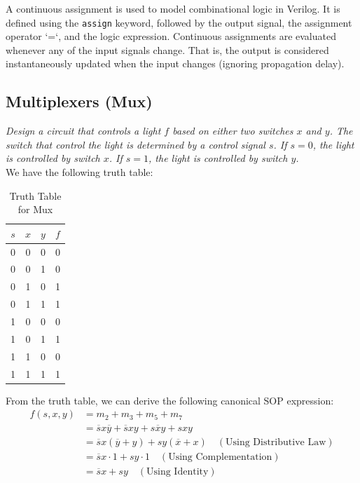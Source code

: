 \documentclass[11pt]{report}
\begin{document}
\begin{definition}
    A continuous assignment is used to model combinational logic in Verilog. It is defined using the \verb|assign| keyword, followed by the output signal, the assignment operator `=`, and the logic expression. Continuous assignments are evaluated whenever any of the input signals change. That is, the output is considered instantaneously updated when the input changes (ignoring propagation delay).
\end{definition}
\subsection{Multiplexers (Mux)}
\begin{example}
    \textit{Design a circuit that controls a light $f$ based on either two switches $x$ and $y$. The switch that control the light is determined by a control signal $s$. If $s = 0$, the light is controlled by switch $x$. If $s = 1$, the light is controlled by switch $y$.}
    \\
    We have the following truth table:

    \begin{table}[h!]
        \centering
        \begin{tabular}{|c|c|c|c|}
            \hline
            $s$ & $x$ & $y$ & $f$ \\
            \hline
            0 & 0 & 0 & 0 \\
            0 & 0 & 1 & 0 \\
            0 & 1 & 0 & 1 \\
            0 & 1 & 1 & 1 \\
            1 & 0 & 0 & 0 \\
            1 & 0 & 1 & 1 \\
            1 & 1 & 0 & 0 \\
            1 & 1 & 1 & 1 \\
            \hline
        \end{tabular}
        \caption{Truth Table for Mux}
        \label{tab:mux_truth_table}
    \end{table}
    
    From the truth table, we can derive the following canonical SOP expression:
    \begin{align*}
        f(s, x, y) &= m_2 + m_3 + m_5 + m_7 \\
        &= \overline{s}x\overline{y} + \overline{s}xy + s\overline{x}y + sxy \\
        &= \overline{s}x(\overline{y} + y) + sy(\overline{x} + x) \quad (\text{Using Distributive Law}) \\
        &= \overline{s}x \cdot 1 + sy \cdot 1 \quad (\text{Using Complementation}) \\
        &= \overline{s}x + sy \quad (\text{Using Identity})
    \end{align*}


\end{example}
\end{document}
